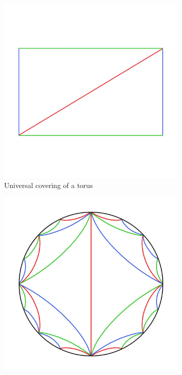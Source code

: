 \documentclass[12pt,a4paper,reqno,parskip=full]{amsart}
\numberwithin{equation}{section}
\theoremstyle{plain}
\theoremstyle{definition}
\begin{document}
\begin{figure}
     \centering
     \captionsetup{justification=centering}
     
     \begin{subfigure}[b]{0.49\textwidth}
         \centering
         \includegraphics[width=\textwidth]{images/Universal Covering.jpg}
         \caption{Universal covering of a torus}
         \label{fig:covering}
     \end{subfigure}
     \hfill
     \begin{subfigure}[b]{0.49\textwidth}
         \centering
         \includegraphics[width=\textwidth]{images/RS colored detailed.jpg}

\end{subfigure}
\end{figure}
\end{document}
